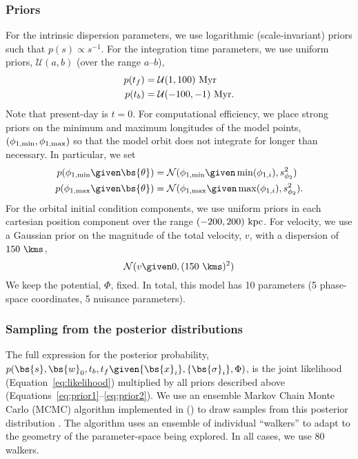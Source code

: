 \documentclass[letterpaper,12pt,preprint]{aastex}
\newcommand{\norm}{\mathcal{N}}
\begin{document}
\subsubsection{Priors}

For the intrinsic dispersion parameters, we use logarithmic (scale-invariant) priors such that $p(s) \propto s^{-1}$. For the integration time parameters, we use uniform priors, $\mathcal{U}(a,b)$ (over the range $a$--$b$),
\begin{align}
	p(t_f) &= \mathcal{U}(1,100)~{\rm Myr}\label{eq:prior1}\\
	p(t_b) &= \mathcal{U}(-100,-1)~{\rm Myr}.
\end{align}
Note that present-day is $t=0$. For computational efficiency, we place strong priors on the minimum and maximum longitudes of the model points, $(\phi_{1,{\rm min}},\phi_{1,{\rm max}})$ so that the model orbit does not integrate for longer than necessary. In particular, we set
\begin{align}
	p(\phi_{1,{\rm min}} \given \bs{\theta}) &= \norm(\phi_{1,{\rm min}} \given \min(\phi_{1,i}), s^2_{\phi_2})\\
	p(\phi_{1,{\rm max}} \given \bs{\theta}) &= \norm(\phi_{1,{\rm max}} \given \max(\phi_{1,i}), s^2_{\phi_2}).
\end{align}
For the orbital initial condition components, we use uniform priors in each cartesian position component over the range $(-200,200)~{\rm kpc}$. For velocity, we use a Gaussian prior on the magnitude of the total velocity, $v$, with a dispersion of $150~\kms$,
\begin{equation}
	\norm(v \given 0, (150~\kms)^2) \label{eq:prior2}
\end{equation}
We keep the potential, $\Phi$, fixed. In total, this model has 10 parameters (5 phase-space coordinates, 5 nuisance parameters).

\subsubsection{Sampling from the posterior distributions}

The full expression for the posterior probability, $p(\bs{s}, \bs{w}_0, t_b, t_f \given \{\bs{x}_i\}, \{\bs{\sigma}_i\}, \Phi)$, is the joint likelihood (Equation~\ref{eq:likelihood}) multiplied by all priors described above (Equations~\ref{eq:prior1}--\ref{eq:prior2}). We use an ensemble Markov Chain Monte Carlo (MCMC) algorithm \citep{goodman10} implemented in \python () to draw samples from this posterior distribution \citep{foremanmackey13}. The algorithm uses an ensemble of individual ``walkers'' to adapt to the geometry of the parameter-space being explored. In all cases, we use 80 walkers.
\end{document}
